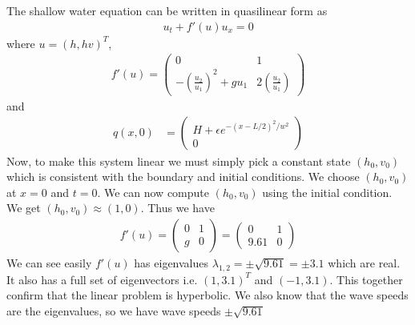 The shallow water equation can be written in quasilinear form as \begin{align*}
u_t + f'(u) u_x = 0
\end{align*}
where $ u = (h,hv)^T $,
\begin{align*}
f'(u) = \begin{pmatrix}
0 & 1 \\
-(\frac{u_2}{u_1})^2 + gu_1 & 2 (\frac{u_2}{u_1})
\end{pmatrix}
\end{align*}
and 
\begin{align*}
q(x,0) &= \begin{pmatrix}
H + \epsilon e^{-(x-L/2)^2/w^2} \\
0
\end{pmatrix} 
\end{align*}
Now, to make this system linear we must simply pick a constant state $(h_0,v_0)$ which is consistent with the boundary and initial conditions. We choose $(h_0,v_0)$ at $x=0$ and $t=0$. We can now compute $(h_0,v_0)$ using the initial condition. We get $(h_0,v_0) \approx (1,0)$. Thus we have 
\begin{align*}
f'(u) = \begin{pmatrix}
0 & 1 \\
g & 0
\end{pmatrix} = \begin{pmatrix}
0 & 1 \\
9.61 & 0
\end{pmatrix}
\end{align*}
We can see easily $f'(u)$ has eigenvalues $\lambda_{1,2} = \pm \sqrt{9.61} = \pm 3.1$ which are real. It also has a full set of eigenvectors i.e. $(1,3.1)^T$ and $(-1,3.1)$. This together confirm that the linear problem is hyperbolic. We also know that the wave speeds are the eigenvalues, so we have wave speeds $\pm \sqrt{9.61}$

